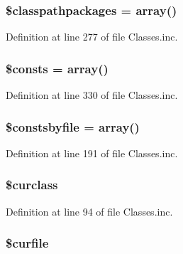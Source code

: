 \hypertarget{class_classes_a28c52044682149838410415e24598fe9}{
\subsubsection[{\$classpathpackages}]{\setlength{\rightskip}{0pt plus 5cm}\$classpathpackages = array()}}\label{class_classes_a28c52044682149838410415e24598fe9}


\-Definition at line 277 of file \-Classes.\-inc.

\hypertarget{class_classes_a34ba5984e16f17633afe3930711d89fb}{
\subsubsection[{\$consts}]{\setlength{\rightskip}{0pt plus 5cm}\$consts = array()}}\label{class_classes_a34ba5984e16f17633afe3930711d89fb}


\-Definition at line 330 of file \-Classes.\-inc.

\hypertarget{class_classes_a9b637e5d0487ef23e3c08ed07054853e}{
\subsubsection[{\$constsbyfile}]{\setlength{\rightskip}{0pt plus 5cm}\$constsbyfile = array()}}\label{class_classes_a9b637e5d0487ef23e3c08ed07054853e}


\-Definition at line 191 of file \-Classes.\-inc.

\hypertarget{class_classes_aef75378be82016414a5efa2c96d6e7ba}{
\subsubsection[{\$curclass}]{\setlength{\rightskip}{0pt plus 5cm}\$curclass}}\label{class_classes_aef75378be82016414a5efa2c96d6e7ba}


\-Definition at line 94 of file \-Classes.\-inc.

\hypertarget{class_classes_a84352b4d740a45279b61228864b9b5e7}{
\subsubsection[{\$curfile}]{\setlength{\rightskip}{0pt plus 5cm}\$curfile}}\label{class_classes_a84352b4d740a45279b61228864b9b5e7}


